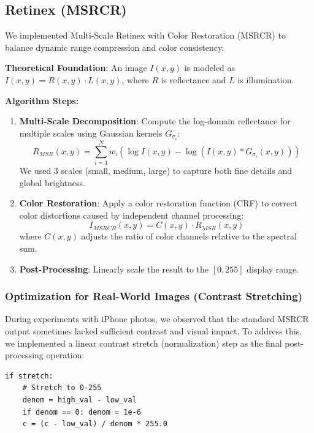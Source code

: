 \subsection{Retinex (MSRCR)}
We implemented Multi-Scale Retinex with Color Restoration (MSRCR) \cite{jobson1997multiscale} to balance dynamic range compression and color consistency.

\textbf{Theoretical Foundation}:
An image $I(x,y)$ is modeled as $I(x,y) = R(x,y) \cdot L(x,y)$, where $R$ is reflectance and $L$ is illumination.

\textbf{Algorithm Steps:}
\begin{enumerate}
    \item \textbf{Multi-Scale Decomposition}: Compute the log-domain reflectance for multiple scales using Gaussian kernels $G_{\sigma_i}$:
    \begin{equation}
        R_{MSR}(x,y) = \sum_{i=1}^N w_i (\log I(x,y) - \log (I(x,y) * G_{\sigma_i}(x,y)))
    \end{equation}
    We used 3 scales (small, medium, large) to capture both fine details and global brightness.
    \item \textbf{Color Restoration}: Apply a color restoration function (CRF) to correct color distortions caused by independent channel processing:
    \begin{equation}
        I_{MSRCR}(x,y) = C(x,y) \cdot R_{MSR}(x,y)
    \end{equation}
    where $C(x,y)$ adjusts the ratio of color channels relative to the spectral sum.
    \item \textbf{Post-Processing}: Linearly scale the result to the $[0, 255]$ display range.
\end{enumerate}

\subsubsection{Optimization for Real-World Images (Contrast Stretching)}
During experiments with iPhone photos, we observed that the standard MSRCR output sometimes lacked sufficient contrast and visual impact. To address this, we implemented a linear contrast stretch (normalization) step as the final post-processing operation:

\begin{verbatim}
if stretch:
    # Stretch to 0-255
    denom = high_val - low_val
    if denom == 0: denom = 1e-6
    c = (c - low_val) / denom * 255.0
\end{verbatim}

